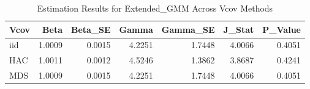 \begin{table}[ht]
\centering
\begin{tabular}{lrrrrrr}
  \hline
Vcov & Beta & Beta\_SE & Gamma & Gamma\_SE & J\_Stat & P\_Value \\ 
  \hline
iid & 1.0009 & 0.0015 & 4.2251 & 1.7448 & 4.0066 & 0.4051 \\ 
  HAC & 1.0011 & 0.0012 & 4.5246 & 1.3862 & 3.8687 & 0.4241 \\ 
  MDS & 1.0009 & 0.0015 & 4.2251 & 1.7448 & 4.0066 & 0.4051 \\ 
   \hline
\end{tabular}
\caption{Estimation Results for Extended_GMM Across Vcov Methods} 
\label{tab:extendedgmm}
\end{table}
